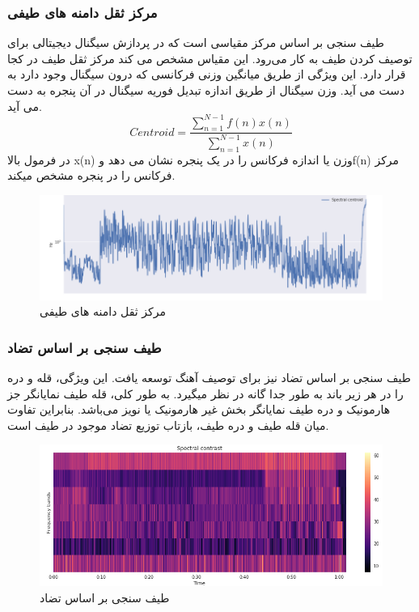 \documentclass[conference]{IEEEtran}
\begin{document}
\subsubsection{ مرکز ثقل دامنه های طیفی   }
طیف سنجی بر اساس مرکز مقیاسی است که در پردازش سیگنال دیجیتالی برای توصیف کردن طیف به کار می‌رود. این مقیاس مشخص می کند مرکز ثقل طیف در کجا قرار دارد. این ویژگی از طریق میانگین وزنی فرکانسی که درون سیگنال وجود دارد به دست می آید. وزن سیگنال از طریق اندازه تبدیل فوریه سیگنال در آن پنجره به دست می آید.
\begin{equation}
    Centroid = \frac{\sum_{n=1}^{N-1}f(n)x(n)}{\sum_{n=1}^{N-1}x(n)}
\end{equation}
در فرمول بالا x(n) وزن یا اندازه فرکانس را در یک پنجره نشان می دهد وf(n)  مرکز فرکانس را در پنجره مشخص میکند.
    \begin{figure}[h!]
\includegraphics[width=\linewidth]{4.png}
      \caption{  مرکز ثقل دامنه های طیفی }
      \label{fig:fig 1}
    \end{figure}
    \subsubsection{ طیف سنجی بر اساس تضاد       }
طیف سنجی بر اساس تضاد نیز برای توصیف آهنگ توسعه یافت. این ویژگی، قله و دره را در هر زیر باند به طور جدا گانه در نظر میگیرد. به طور کلی، قله طیف نمایانگر جز هارمونیک و دره طیف نمایانگر بخش غیر هارمونیک یا نویز می‌باشد. بنابراین تفاوت میان قله طیف و دره طیف، بازتاب توزیع تضاد موجود در طیف است.
    \begin{figure}[h!]
\includegraphics[width=\linewidth]{5.png}
      \caption{  طیف سنجی بر اساس تضاد }
      \label{fig:fig 1}
    \end{figure}
\end{document}
